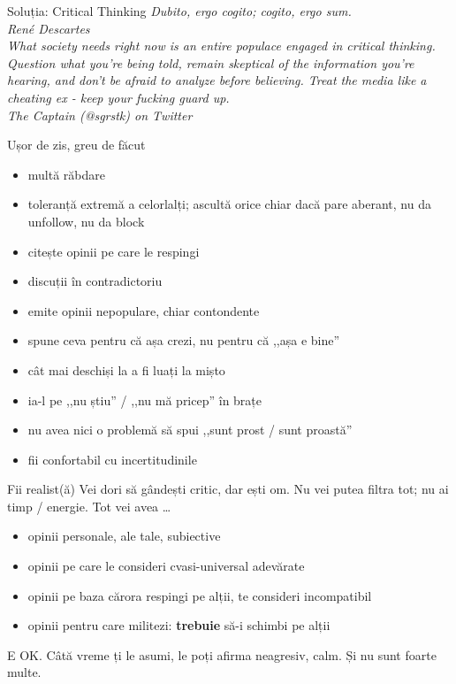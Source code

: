 \documentclass{simple}
\begin{document}
\begin{frame}{Soluția: Critical Thinking}
  \pause
  \textit{Dubito, ergo cogito; cogito, ergo sum.} \\
  \vspace{3mm}
  \hfill \textit{René Descartes} \\
  \vspace{1cm}
  \pause
  \textit{What society needs right now is an entire populace engaged in critical thinking. Question what you're being told, remain skeptical of the information you're hearing, and don't be afraid to analyze before believing. Treat the media like a cheating ex - keep your fucking guard up.} \\
  \vspace{3mm}
  \hfill \textit{The Captain (@sgrstk) on Twitter}
\end{frame}

\begin{frame}{Ușor de zis, greu de făcut}
  \begin{itemize}
    \pause
    \item multă răbdare
    \pause
    \item toleranță extremă a celorlalți; ascultă orice chiar dacă pare aberant, nu da unfollow, nu da block
    \pause
    \item citește opinii pe care le respingi
    \pause
    \item discuții în contradictoriu
    \pause
    \item emite opinii nepopulare, chiar contondente
    \pause
    \item spune ceva pentru că așa crezi, nu pentru că ,,așa e bine''
    \pause
    \item cât mai deschiși la a fi luați la mișto
    \pause
    \item ia-l pe ,,nu știu'' / ,,nu mă pricep'' în brațe
    \pause
    \item nu avea nici o problemă să spui ,,sunt prost / sunt proastă''
    \pause
    \item fii confortabil cu incertitudinile
  \end{itemize}
\end{frame}

\begin{frame}{Fii realist(ă)}
  \pause
  Vei dori să gândești critic, dar ești om. Nu vei putea filtra tot; nu ai timp / energie. Tot vei avea \ldots
  \begin{itemize}
    \pause
    \item opinii personale, ale tale, subiective
    \pause
    \item opinii pe care le consideri cvasi-universal adevărate
    \pause
    \item opinii pe baza cărora respingi pe alții, te consideri incompatibil
    \pause
    \item opinii pentru care militezi: \textbf{trebuie} să-i schimbi pe alții
  \end{itemize}
  \pause
  E OK. Câtă vreme ți le asumi, le poți afirma neagresiv, calm. Și nu sunt foarte multe.
\end{frame}
\end{document}
